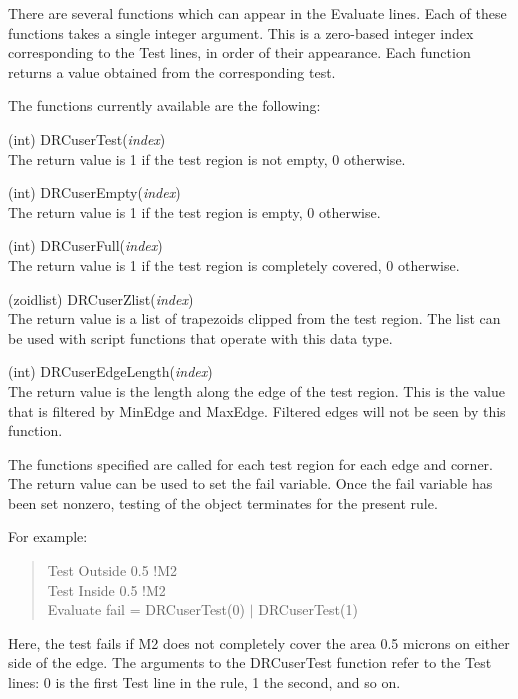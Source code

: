 There are several functions which can appear in the {\et Evaluate}
lines.  Each of these functions takes a single integer argument.  This
is a zero-based integer index corresponding to the {\et Test} lines,
in order of their appearance.  Each function returns a value obtained
from the corresponding test.

The functions currently available are the following:

\begin{description}
\item{(int) {\vt DRCuserTest}({\it index\/})}\\
The return value is 1 if the test region is not empty, 0 otherwise.

\item{(int) {\vt DRCuserEmpty}({\it index\/})}\\
The return value is 1 if the test region is empty, 0 otherwise.

\item{(int) {\vt DRCuserFull}({\it index\/})}\\
The return value is 1 if the test region is completely covered, 0
otherwise.

\item{(zoidlist) {\vt DRCuserZlist}({\it index\/})}\\
The return value is a list of trapezoids clipped from the test region. 
The list can be used with script functions that operate with this data
type.

\item{(int) {\vt DRCuserEdgeLength}({\it index\/})}\\
The return value is the length along the edge of the test region. 
This is the value that is filtered by {\et MinEdge} and {\et MaxEdge}. 
Filtered edges will not be seen by this function.
\end{description}

The functions specified are called for each test region for each edge
and corner.  The return value can be used to set the {\vt fail}
variable.  Once the {\vt fail} variable has been set nonzero, testing
of the object terminates for the present rule.

For example:
\begin{quote}\vt
Test Outside 0.5 !M2\\
Test Inside 0.5 !M2\\
Evaluate fail = DRCuserTest(0) $|$ DRCuserTest(1)
\end{quote}
Here, the test fails if {\vt M2} does not completely cover the area
0.5 microns on either side of the edge.  The arguments to the {\vt
DRCuserTest} function refer to the {\vt Test} lines:  0 is the first
{\vt Test} line in the rule, 1 the second, and so on.

